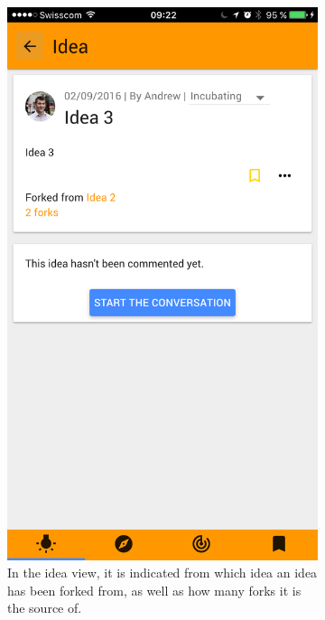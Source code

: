 \documentclass[a4paper,12pt, oneside]{article}
\begin{document}
\begin{figure}[!htb]
\begin{subfigure}[t]{.32\textwidth}
        \includegraphics[width=\textwidth]{images/forks_idea.png}
        \caption{In the idea view, it is indicated from which idea an idea has been forked from, as well as how many forks it is the source of.}
    \end{subfigure}
    \hfill
    \begin{subfigure}[t]{.32\textwidth}

\end{subfigure}
\end{figure}
\end{document}

